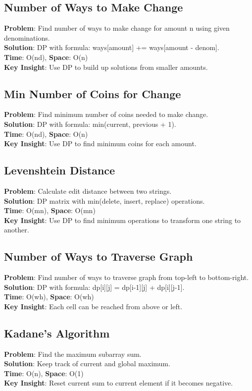 \documentclass{report}
\begin{document}
\subsection{Number of Ways to Make Change}
\textbf{Problem}: Find number of ways to make change for amount n using given denominations.\\
\textbf{Solution}: DP with formula: ways[amount] += ways[amount - denom].\\
\textbf{Time}: O(nd), \textbf{Space}: O(n)\\
\textbf{Key Insight}: Use DP to build up solutions from smaller amounts.

\subsection{Min Number of Coins for Change}
\textbf{Problem}: Find minimum number of coins needed to make change.\\
\textbf{Solution}: DP with formula: min(current, previous + 1).\\
\textbf{Time}: O(nd), \textbf{Space}: O(n)\\
\textbf{Key Insight}: Use DP to find minimum coins for each amount.

\subsection{Levenshtein Distance}
\textbf{Problem}: Calculate edit distance between two strings.\\
\textbf{Solution}: DP matrix with min(delete, insert, replace) operations.\\
\textbf{Time}: O(mn), \textbf{Space}: O(mn)\\
\textbf{Key Insight}: Use DP to find minimum operations to transform one string to another.

\subsection{Number of Ways to Traverse Graph}
\textbf{Problem}: Find number of ways to traverse graph from top-left to bottom-right.\\
\textbf{Solution}: DP with formula: dp[i][j] = dp[i-1][j] + dp[i][j-1].\\
\textbf{Time}: O(wh), \textbf{Space}: O(wh)\\
\textbf{Key Insight}: Each cell can be reached from above or left.

\subsection{Kadane's Algorithm}
\textbf{Problem}: Find the maximum subarray sum.\\
\textbf{Solution}: Keep track of current and global maximum.\\
\textbf{Time}: O(n), \textbf{Space}: O(1)\\
\textbf{Key Insight}: Reset current sum to current element if it becomes negative.
\end{document}
